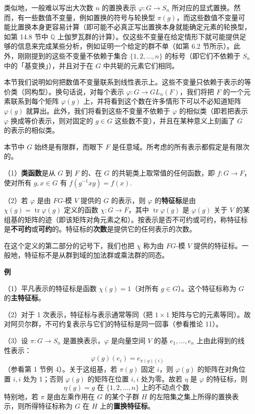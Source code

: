 类似地，一般难以写出大次数 \(n\) 的置换表示 \(\varphi : G \to S_n\) 所对应的显式置换。然而，有一些数值不变量，例如置换的符号与轮换型 \(\pi(g)\)，而这些数值不变量可能比置换本身更容易计算（即可能不必真正写出置换本身就能确定元素的轮换型，如第 14.8 节中 \(\mathbb{Q}\) 上伽罗瓦群的计算）。仅这些不变量在给定情形下就可能提供足够的信息来完成某些分析，例如证明一个给定的群不单（如第 6.2 节所示）。此外，刚刚提到的这些不变量不依赖于集合 \(\{1, 2, \ldots, n\}\) 的标号（即它们不依赖于 \(S_n\) 中的「基变换」），并且对于在 \(G\) 中共轭的元素它们相同。

本节我们说明如何把数值不变量联系到线性表示上。这些不变量只依赖于表示的等价类（同构型）。换句话说，对每个表示 \(\varphi : G \to GL_n(F)\)，我们将把 \(F\) 的一个元素联系到每个矩阵 \(\varphi(g)\) 上，并将看到这个数在许多情形下可以不必知道矩阵 \(\varphi(g)\) 就算出。此外，我们将看到这些不变量不依赖于 \(\varphi\) 的相似类（即若把表示 \(\varphi\) 换成等价表示，则对固定的 \(g \in G\) 这些数不变），并且在某种意义上刻画了 \(G\) 的表示的相似类。

本节中 \(G\) 始终是有限群，而眼下 \(F\) 是任意域。所考虑的所有表示都假定是有限次的。

\begin{definition}
（1）\textbf{类函数}是从 \(G\) 到 \(F\) 的、在 \(G\) 的共轭类上取常值的任何函数，即 \(f : G \to F\)，使对所有 \(g, x \in G\) 有 \(f(g^{-1}xg) = f(x)\).

（2）若 \(\varphi\) 是由 \(FG\)-模 \(V\) 提供的 \(G\) 的表示，则 \(\varphi\) 的\textbf{特征标}是由 \(\chi(g) = \operatorname{tr}\varphi(g)\) 定义的函数 \(\chi : G \to F\)，其中 \(\operatorname{tr}\varphi(g)\) 是 \(\varphi(g)\) 关于 \(V\) 的某组基的矩阵的迹（即该矩阵对角元素之和）。按表示是否不可约或可约，称特征标是\textbf{不可约}或\textbf{可约}的。特征标的\textbf{次数}是提供它的任何表示的次数。
\end{definition}

在这个定义的第二部分的记号下，我们也把 \(\chi\) 称为由 \(FG\)-模 \(V\) 提供的特征标。一般地，特征标不是从群到域的加法群或乘法群的同态。

\noindent\textbf{例}

（1）平凡表示的特征标是函数 \(\chi(g) = 1\)（对所有 \(g \in G\)）。这个特征标称为 \(G\) 的\textbf{主特征标}。

（2）对于 1 次表示，特征标与表示通常等同（把 \(1 \times 1\) 矩阵与它的元素等同）。故对阿贝尔群，不可约复表示与它们的特征标是同一回事（参看推论 11）。

（3）设 \(\pi : G \to S_n\) 是置换表示，\(\varphi\) 是向量空间 \(V\) 的基 \(e_1, \ldots, e_n\) 上由此得到的线性表示：
\[
\varphi(g)(e_i) = e_{\pi(g)(i)}
\]
（参看第 1 节例 4）。关于这组基，若 \(\pi(g)\) 固定 \(i\)，则 \(\varphi(g)\) 的矩阵在对角位置 \(i,i\) 处为 1；否则 \(\varphi(g)\) 的矩阵在位置 \(i,i\) 处为零。故若 \(\eta\) 是 \(\varphi\) 的特征标，则
\[
\eta(g) = g \text{ 在 } \{1, 2, \ldots, n\} \text{ 上的不动点个数}.
\]
特别地，若 \(\pi\) 是由左乘作用在 \(G\) 的某个子群 \(H\) 的左陪集之集上所得的置换表示，则所得特征标称为 \(G\) 在 \(H\) 上的\textbf{置换特征标}。

